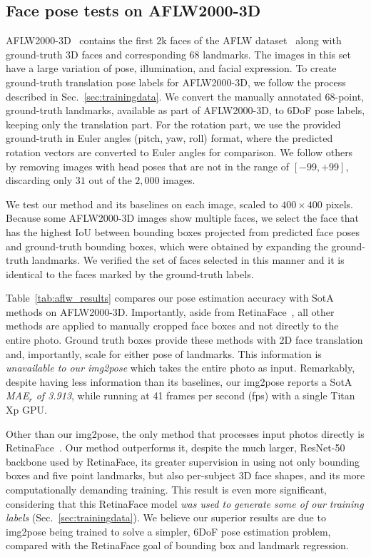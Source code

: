 \documentclass[final]{cvpr}
\newcommand{\minisection}[1]{\vspace{1mm}\noindent{\textbf{#1}.}}
\begin{document}
\subsection{Face pose tests on AFLW2000-3D}\label{sec:AFLW2000}
AFLW2000-3D~\cite{3ddfa} contains the first $2$k faces of the AFLW dataset~\cite{aflw} along with ground-truth 3D faces and corresponding $68$ landmarks. The images in this set have a large variation of pose, illumination, and facial expression. 
To create ground-truth translation pose labels for AFLW2000-3D, we follow the process described in Sec.~\ref{sec:trainingdata}. We convert the manually annotated 68-point, ground-truth landmarks, available as part of AFLW2000-3D, to 6DoF pose labels, keeping only the translation part.
For the rotation part, we use the provided ground-truth in Euler angles (pitch, yaw, roll) format, where the predicted rotation vectors are converted to Euler angles for comparison.
We follow others~\cite{hopenet, fsanet} by removing images with head poses that are not in the range of $[-99, +99]$, discarding only $31$ out of the $2,000$ images.

We test our method and its baselines on each image, scaled to $400\times400$ pixels. Because some AFLW2000-3D images show multiple faces, we select the face that has the highest IoU between bounding boxes projected from predicted face poses and ground-truth bounding boxes, which were obtained by expanding the ground-truth landmarks. We verified the set of faces selected in this manner and it is identical to the faces marked by the ground-truth labels. 

\minisection{AFLW2000-3D face pose results} Table~\ref{tab:aflw_results} compares our pose estimation accuracy with SotA methods on AFLW2000-3D. Importantly, aside from RetinaFace~\cite{retinaface}, all other methods are applied to manually cropped face boxes and not directly to the entire photo. Ground truth boxes provide these methods with 2D face translation and, importantly, scale for either pose of landmarks. This information is {\em unavailable to our img2pose} which takes the entire photo as input. Remarkably, despite having less information than its baselines, our img2pose reports a SotA {\em MAE$_r$ of 3.913}, while running at 41 frames per second (fps) with a single Titan Xp GPU.


Other than our img2pose, the only method that processes input photos directly is RetinaFace~\cite{retinaface}. Our method outperforms it, despite the much larger, ResNet-50 backbone used by RetinaFace, its greater supervision in using not only bounding boxes and five point landmarks, but also per-subject 3D face shapes, and its more computationally demanding training. This result is even more significant, considering that this RetinaFace model {\em was used to generate some of our training labels} (Sec.~\ref{sec:trainingdata}). We believe our superior results are due to img2pose being trained to solve a simpler, 6DoF pose estimation problem, compared with the RetinaFace goal of bounding box and landmark regression. 
\end{document}
